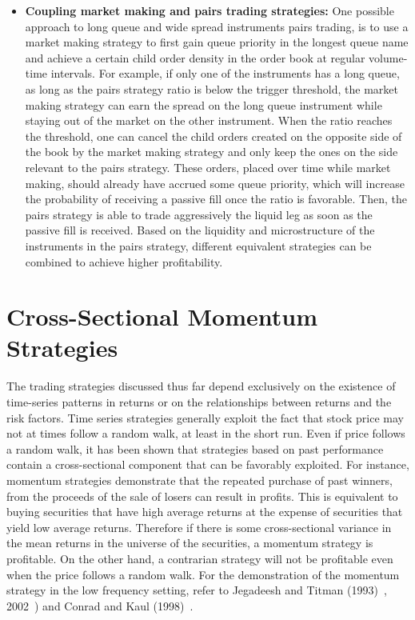 \begin{itemize}
\item \textbf{Coupling market making and pairs trading strategies:} One possible approach to long queue and wide spread instruments pairs trading, is to use a market making strategy to first gain queue priority in the longest queue name and achieve a certain child order density in the order book at regular volume-time intervals. For example, if only one of the instruments has a long queue, as long as the pairs strategy ratio is below the trigger threshold, the market making strategy can earn the spread on the long queue instrument while staying out of the market on the other instrument. When the ratio reaches the threshold, one can cancel the child orders created on the opposite side of the book by the market making strategy and only keep the ones on the side relevant to the pairs strategy. These orders, placed over time while market making, should already have accrued some queue priority, which will increase the probability of receiving a passive fill once the ratio is favorable. Then, the pairs strategy is able to trade aggressively the liquid leg as soon as the passive fill is received. Based on the liquidity and microstructure of the instruments in the pairs strategy, different equivalent strategies can be combined to achieve higher profitability. \label{in:pairs2}
\end{itemize}



\section{Cross-Sectional Momentum Strategies} \label{in:mom2}

The trading strategies discussed thus far depend exclusively on the existence of time-series patterns in returns or on the relationships between returns and the risk factors. Time series strategies generally exploit the fact that stock price may not at times follow a random walk, at least in the short run. Even if price follows a random walk, it has been shown that strategies based on past performance contain a cross-sectional component that can be favorably exploited. For instance, momentum strategies demonstrate that the repeated purchase of past winners, from the proceeds of the sale of losers can result in profits. This is equivalent to buying securities that have high average returns at the expense of securities that yield low average returns. Therefore if there is some cross-sectional variance in the mean returns in the universe of the securities, a momentum strategy is profitable. On the other hand, a contrarian strategy will not be profitable even when the price follows a random walk. For the demonstration of the momentum strategy in the low frequency setting, refer to Jegadeesh and Titman (1993)~\cite{JeTit1993}, 2002~\cite{JeTit}) and Conrad and Kaul (1998)~\cite{conrad1998}.


